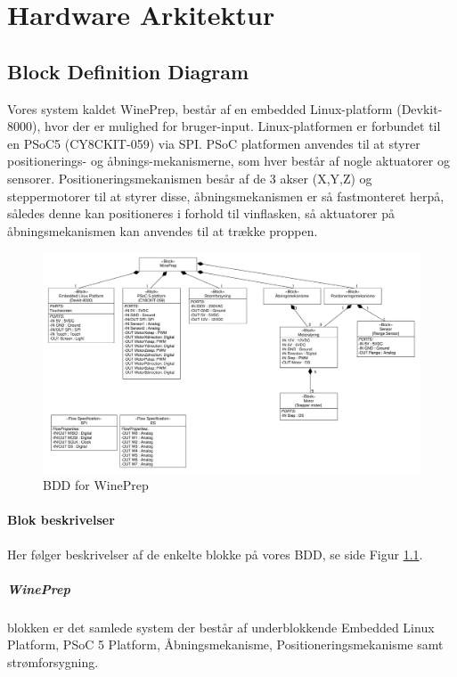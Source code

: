 \chapter{Hardware Arkitektur}

\section{Block Definition Diagram}
Vores system kaldet WinePrep, består af en embedded Linux-platform (Devkit-8000), hvor der er mulighed for bruger-input. Linux-platformen er forbundet til en PSoC5 (CY8CKIT-059) via SPI. PSoC platformen anvendes til at styrer positionerings- og åbnings-mekanismerne, som hver består af nogle aktuatorer og sensorer. Positioneringsmekanismen besår af de 3 akser (X,Y,Z) og steppermotorer til at styrer disse, åbningsmekanismen er så fastmonteret herpå, således denne kan positioneres i forhold til vinflasken, så aktuatorer på åbningsmekanismen kan anvendes til at trække proppen.

\begin{figure}[H]
	\centering
	\includegraphics[scale=0.27]{blockdefinitiondiagram}
	\caption{BDD for WinePrep}
	\label{BDD}
\end{figure}

\subsubsection{Blok beskrivelser}
Her følger beskrivelser af de enkelte blokke på vores BDD, se side \pageref{BDD} Figur \ref{BDD}.

\paragraph{WinePrep} blokken er det samlede system der består af underblokkende Embedded Linux Platform, PSoC 5 Platform, Åbningsmekanisme, Positioneringsmekanisme samt strømforsygning.

